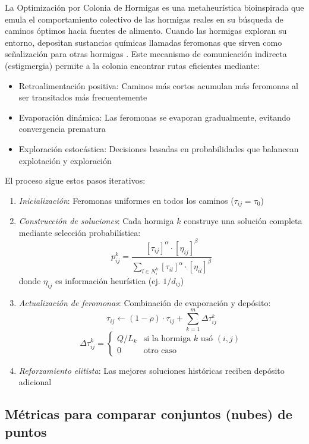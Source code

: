 La Optimización por Colonia de Hormigas es una metaheurística bioinspirada que emula el comportamiento colectivo de las hormigas reales en su búsqueda de caminos óptimos hacia fuentes de alimento. Cuando las hormigas exploran su entorno, depositan sustancias químicas llamadas feromonas que sirven como señalización para otras hormigas \cite{Dorigo1996}. Este mecanismo de comunicación indirecta (estigmergia) permite a la colonia encontrar rutas eficientes mediante:
\begin{itemize}
    
    \item Retroalimentación positiva: Caminos más cortos acumulan más feromonas al ser transitados más frecuentemente
    \item Evaporación dinámica: Las feromonas se evaporan gradualmente, evitando convergencia prematura
    \item Exploración estocástica: Decisiones basadas en probabilidades que balancean explotación y exploración
\end{itemize}

El proceso sigue estos pasos iterativos:

\begin{enumerate}
    \item \textit{Inicialización}: Feromonas uniformes en todos los caminos ($\tau_{ij} = \tau_0$)
    \item \textit{Construcción de soluciones}: Cada hormiga $k$ construye una solución completa mediante selección probabilística:
    \[
    p_{ij}^k = \frac{[\tau_{ij}]^\alpha \cdot [\eta_{ij}]^\beta}{\sum_{l \in N_i^k} [\tau_{il}]^\alpha \cdot [\eta_{il}]^\beta}
    \]
    donde $\eta_{ij}$ es información heurística (ej. $1/d_{ij}$)
    \item \textit{Actualización de feromonas}: Combinación de evaporación y depósito:
    \[
    \tau_{ij} \leftarrow (1 - \rho) \cdot \tau_{ij} + \sum_{k=1}^m \Delta \tau_{ij}^k
    \]
    \[
    \Delta \tau_{ij}^k = 
    \begin{cases} 
    Q/L_k & \text{si la hormiga } k \text{ usó } (i,j) \\
    0 & \text{otro caso}
    \end{cases}
    \]
    \item \textit{Reforzamiento elitista}: Las mejores soluciones históricas reciben depósito adicional
\end{enumerate}

\subsection{Métricas para comparar conjuntos (nubes) de puntos}


